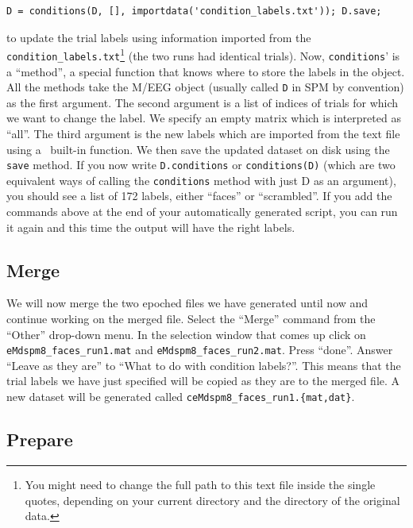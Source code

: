 \begin{verbatim}
D = conditions(D, [], importdata('condition_labels.txt')); D.save;
\end{verbatim}
to update the trial labels using information imported from the \texttt{condition\_labels.txt}\footnote{You might need to change the full path to this text file inside the single quotes, depending on your current directory and the directory of the original data.} (the two runs had identical trials). Now, \texttt{conditions}' is a ``method'', a special function that knows where to store the labels in the object. All the methods take the M/EEG object (usually called \texttt{D} in SPM by convention) as the first argument. The second argument is a list of indices of trials for which we want to change the label. We specify an empty matrix which is interpreted as ``all''. The third argument is the new labels which are imported from the text file using a \matlab\ built-in function. We then save the updated dataset on disk using the \texttt{save} method. If you now write \texttt{D.conditions} or \texttt{conditions(D)} (which are two equivalent ways of calling the \texttt{conditions} method with just D as an argument), you should see a list of 172 labels, either ``faces'' or ``scrambled''. If you add the commands above at the end of your automatically generated script, you can run it again and this time the output will have the right labels.

\subsection{Merge}

We will now merge the two epoched files we have generated until now and continue working on the merged file. Select the ``Merge'' command from the ``Other'' drop-down menu. In the selection window that comes up click on \texttt{eMdspm8\_faces\_run1.mat} and \texttt{eMdspm8\_faces\_run2.mat}. Press ``done''. Answer ``Leave as they are'' to ``What to do with condition labels?''. This means that the trial labels we have just specified will be copied as they are to the merged file. A new dataset will be generated called \texttt{ceMdspm8\_faces\_run1.\{mat,dat\}}.

\subsection{Prepare}

